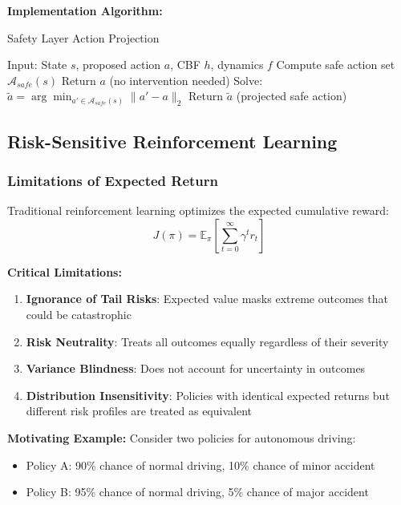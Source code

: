 \documentclass[12pt]{article}
\begin{document}
{{{{\textbf{Implementation Algorithm:}
\begin{algorithm}[H]
\caption{Safety Layer Action Projection}
\begin{algorithmic}[1]
\STATE Input: State $s$, proposed action $a$, CBF $h$, dynamics $f$
\STATE Compute safe action set $\mathcal{A}_{safe}(s)$
    \STATE Return $a$ (no intervention needed)
\ELSE
    \STATE Solve: $\tilde{a} = \arg\min_{a' \in \mathcal{A}_{safe}(s)} \|a' - a\|_2$
    \STATE Return $\tilde{a}$ (projected safe action)
\ENDIF
\end{algorithmic}
\end{algorithm}

\subsection{Risk-Sensitive Reinforcement Learning}

\subsubsection{Limitations of Expected Return}

Traditional reinforcement learning optimizes the expected cumulative reward:
\begin{equation}
J(\pi) = \mathbb{E}_\pi\left[\sum_{t=0}^{\infty} \gamma^t r_t\right]
\end{equation}

\textbf{Critical Limitations:}
\begin{enumerate}
\item \textbf{Ignorance of Tail Risks}: Expected value masks extreme outcomes that could be catastrophic
\item \textbf{Risk Neutrality}: Treats all outcomes equally regardless of their severity
\item \textbf{Variance Blindness}: Does not account for uncertainty in outcomes
\item \textbf{Distribution Insensitivity}: Policies with identical expected returns but different risk profiles are treated as equivalent
\end{enumerate}

\textbf{Motivating Example:} Consider two policies for autonomous driving:
\begin{itemize}
\item Policy A: 90\% chance of normal driving, 10\% chance of minor accident
\item Policy B: 95\% chance of normal driving, 5\% chance of major accident
\end{itemize}

}}}}
\end{document}
